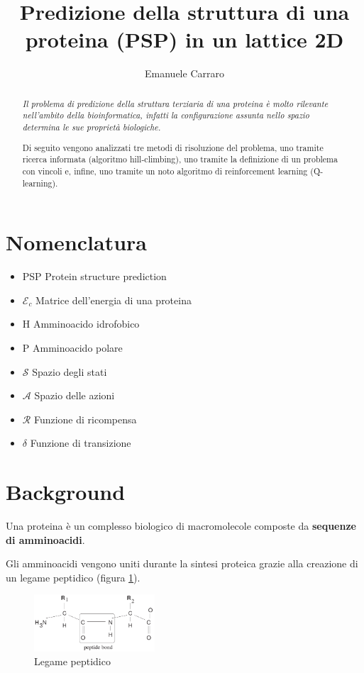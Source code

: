 \documentclass[conference]{IEEEtran}
\title{Predizione della struttura di una proteina (PSP) in un lattice 2D}
\author{Emanuele Carraro}
\begin{document}
\maketitle    

\begin{abstract}
{\it Il problema di predizione della struttura terziaria di una proteina è molto rilevante nell'ambito della bioinformatica, infatti la configurazione assunta nello spazio determina le sue proprietà biologiche.

Di seguito vengono analizzati tre metodi di risoluzione del problema, uno tramite ricerca informata (algoritmo hill-climbing), uno tramite la definizione di un problema con vincoli e, infine, uno tramite un noto algoritmo di reinforcement learning (Q-learning).
}
\end{abstract}

\section{Nomenclatura}

\begin{itemize}
 \item PSP Protein structure prediction
 \item $\mathcal{E}_c$ Matrice dell'energia di una proteina
 \item H Amminoacido idrofobico
 \item P Amminoacido polare
 \item $\mathcal{S}$ Spazio degli stati
 \item $\mathcal{A}$ Spazio delle azioni
 \item $\mathcal{R}$ Funzione di ricompensa
 \item $\delta$ Funzione di transizione
\end{itemize}

\section{Background}

Una proteina è un complesso biologico di macromolecole composte da \textbf{sequenze di amminoacidi}.

Gli amminoacidi vengono uniti durante la sintesi proteica grazie alla creazione di un legame peptidico (figura \ref{fig:pept}).

\begin{figure}[h]
\centering
\includegraphics[width=0.4\textwidth]{figure/peptideBond.png}
\caption{Legame peptidico}
\label{fig:pept}
\end{figure}
\end{document}
